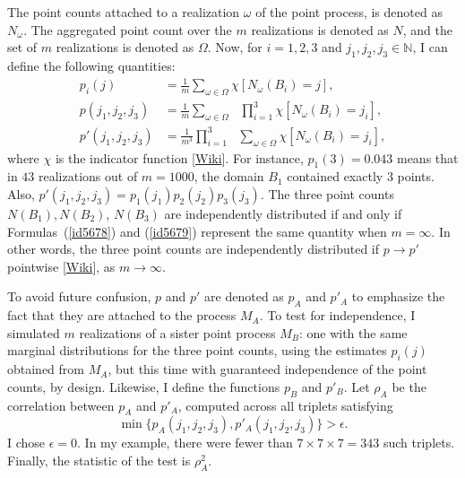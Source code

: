 \documentclass[10pt]{article}
\begin{document}
The point counts attached to a realization $\omega$ of the point process, is denoted as $N_\omega$. The aggregated point count over the $m$ realizations is denoted as $N$, and the set of $m$ realizations is denoted as $\Omega$. Now, for $i=1,2,3$ and $j_1,j_2,j_3\in\mathbb{N}$, I can define the following quantities:
\begin{align}
p_i(j) & =  \frac{1}{m}\sum_{\omega\in\Omega} \chi[N_\omega(B_i)=j], \nonumber \\
p(j_1,j_2,j_3) & =\frac{1}{m}\sum_{\omega\in\Omega} \mbox{ } \prod_{i=1}^3 \chi[N_\omega(B_i)=j_i],\label{id5678} \\
p'(j_1,j_2,j_3) &=\frac{1}{m^3}\prod_{i=1}^3 \mbox{  } \sum_{\omega\in\Omega} \chi[N_\omega(B_i)=j_i], \label{id5679} 
\end{align}
where $\chi$ is the indicator function [\href{https://en.wikipedia.org/wiki/Indicator_function}{Wiki}]. For instance, $p_1(3)=0.043$ means that in $43$ realizations out of $m=\num{1000}$, the domain $B_1$ contained exactly $3$ points. Also, $p'(j_1,j_2,j_3) =p_1(j_1)p_2(j_2)p_3(j_3)$. The three point counts $N(B_1),N(B_2)$, $N(B_3)$ are independently distributed if and only if Formulas~(\ref{id5678}) and (\ref{id5679}) represent 
the same quantity when $m=\infty$. In other words, the three point counts are independently distributed if $p\rightarrow p'$ pointwise [\href{https://en.wikipedia.org/wiki/Pointwise_convergence}{Wiki}], as $m\rightarrow\infty$. 

To avoid future confusion, $p$ and $p'$ are denoted as $p_A$ and $p'_A$ to emphasize the fact that they are attached to the process $M_A$. 
To test for independence, I simulated $m$ realizations of a sister point process $M_B$: one with the same marginal distributions for the three point counts, using the
estimates $p_i(j)$ obtained from $M_A$, but this time with guaranteed independence of the point counts, by design. Likewise, I
define the functions $p_B$ and $p'_B$. Let $\rho_A$ be the correlation between $p_A$ and $p'_A$, computed across all triplets satisfying
$$\min \{p_A(j_1,j_2,j_3), p'_A(j_1,j_2,j_3)\}>\epsilon.$$ 
I chose $\epsilon=0$. In my example, there were fewer than $7\times 7  \times 7= 343$ such triplets. 
Finally, the statistic of the test is $\rho_A^2$. \\

\end{document}
